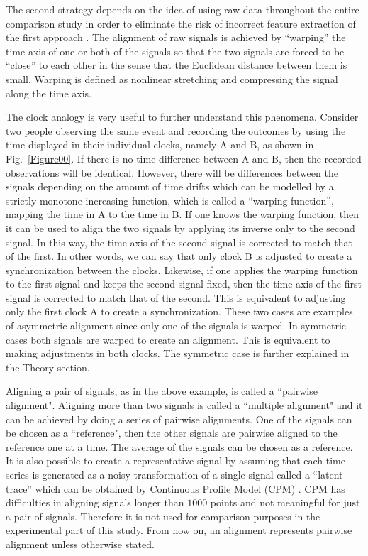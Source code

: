 \documentclass[number,1p,12pt]{elsarticle}
\begin{document}
The second strategy depends on the idea of using raw data throughout the entire comparison study in order to eliminate the risk of incorrect feature extraction of the first approach \cite{Crowe2005,Manaster2005,Mott1998}. The alignment of raw signals is achieved by ``warping'' the time axis of one or both of the signals so that the two signals are forced to be ``close'' to each other in the sense that the Euclidean distance between them is small. Warping is defined as nonlinear stretching and compressing the signal along the time axis. 

The clock analogy is very useful to further understand this phenomena. Consider two people observing the same event and recording the outcomes by using the time displayed in their individual clocks, namely A and B, as shown in Fig.~\ref{Figure00}. If there is no time difference between A and B, then the recorded observations will be identical. However, there will be differences between the signals depending on the amount of time drifts which can be modelled by a strictly monotone increasing function, which is called a ``warping function'', mapping the time in A to the time in B. If one knows the warping function, then it can be used to align the two signals by applying its inverse only to the second signal. In this way, the time axis of the second signal is corrected to match that of the first. In other words, we can say that only clock B is adjusted to create a synchronization between the clocks. Likewise, if one applies the warping function to the first signal and keeps the second signal fixed, then the time axis of the first signal is corrected to match that of the second. This is equivalent to adjusting only the first clock A to create a synchronization. These  two cases are examples of asymmetric alignment since only one of the signals is warped. In symmetric cases both signals are warped to create an alignment. This is equivalent to making adjustments in both clocks.  The symmetric case is further explained in the Theory section.

Aligning a pair of signals, as in the above example, is called a ``pairwise alignment". Aligning more than two signals is called a ``multiple alignment" and it can be achieved by doing a series of pairwise alignments. One of the signals can be chosen as a ``reference", then the other signals are pairwise aligned to the reference one at a time. The average of the signals can be chosen as a reference. It is also possible to create a representative signal by assuming that each time series is generated as a noisy transformation of a single signal called a ``latent trace'' which can be obtained by Continuous Profile Model (CPM)  \cite{Listgarten2005}. CPM has difficulties in aligning signals longer than $1000$ points and not meaningful for just a pair of signals.  Therefore it is not used for comparison purposes in the experimental part of this study. From now on, an alignment represents pairwise alignment unless otherwise stated.
\end{document}
